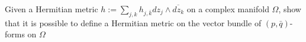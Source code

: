 \documentclass[../main.tex]{subfiles}
\begin{document}
\begin{problem}
Given a Hermitian metric $h :=\sum_{j,k} h_{j,\bar k} dz_j \wedge \overline{d z_k}$ on a complex manifold $\Omega$, show that it is possible to define a Hermitian metric on the vector bundle of $(p,\bar q)$-forms on $\Omega$
\end{problem}
\end{document}
